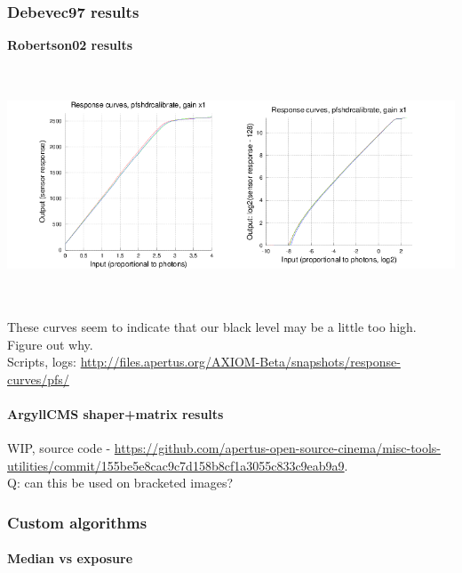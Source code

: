 \subsubsection{Debevec97 results}

\textbf{Robertson02 results}

\begin{center}
\includegraphics[height=7cm]{images/response-curve-pfs}
\end{center}

These curves seem to indicate that our black level may be a little too high. Figure out why. \\

Scripts, logs: \href{http://files.apertus.org/AXIOM-Beta/snapshots/response-curves/pfs/}{http://files.apertus.org/AXIOM-Beta/snapshots/response-curves/pfs/}\\

\paragraph{ArgyllCMS shaper+matrix results}

WIP, source code - \href{https://github.com/apertus-open-source-cinema/misc-tools-utilities/commit/155be5e8cac9c7d158b8cf1a3055c833c9eab9a9}{https://github.com/apertus-open-source-cinema/misc-tools-utilities/commit/155be5e8cac9c7d158b8cf1a3055c833c9eab9a9}.\\

Q: can this be used on bracketed images?\\


\subsubsection{Custom algorithms}

\paragraph{Median vs exposure}\mbox{}\\

